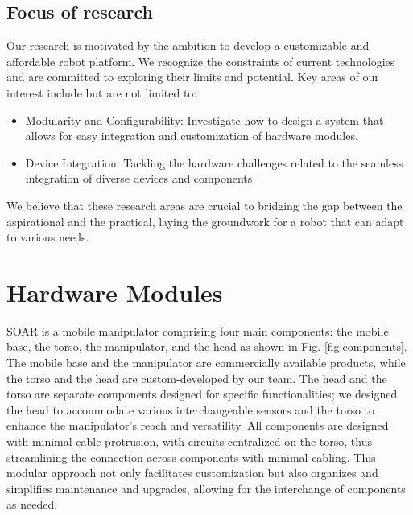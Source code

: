 \documentclass[runningheads,a4paper]{llncs}
\begin{document}
\subsection{Focus of research}
Our research is motivated by the ambition to develop a customizable and affordable robot platform.
We recognize the constraints of current technologies and are committed to exploring their limits and potential. Key areas of our interest include but are not limited to:
\begin{itemize}
	\item Modularity and Configurability: Investigate how to design a system that allows for easy integration and customization of hardware modules.
	\item Device Integration: Tackling the hardware challenges related to the seamless integration of diverse devices and components
\end{itemize}
We believe that these research areas are crucial to bridging the gap between the aspirational and the practical, laying the groundwork for a robot that can adapt to various needs.

\section{Hardware Modules}
SOAR is a mobile manipulator comprising four main components: the mobile base, the torso, the manipulator, and the head as shown in Fig. \ref{fig:components}.
The mobile base and the manipulator are commercially available products, while the torso and the head are custom-developed by our team.
The head and the torso are separate components designed for specific functionalities; we designed the head to accommodate various interchangeable sensors and the torso to enhance the manipulator's reach and versatility.
All components are designed with minimal cable protrusion, with circuits centralized on the torso, thus streamlining the connection across components with minimal cabling.
This modular approach not only facilitates customization but also organizes and simplifies maintenance and upgrades, allowing for the interchange of components as needed.
\end{document}
